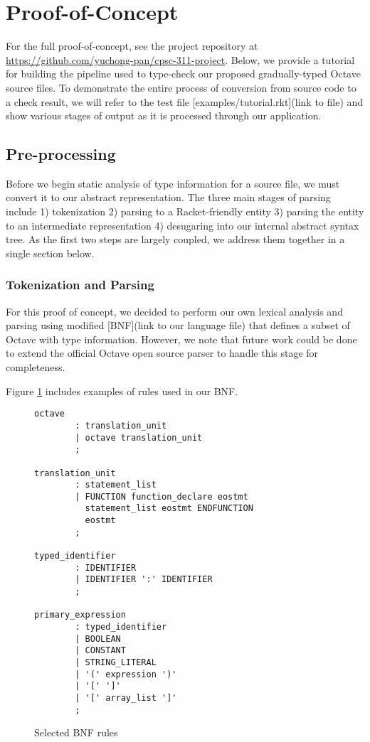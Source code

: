 \section{Proof-of-Concept}
For the full proof-of-concept, see the project repository at \url{https://github.com/yuchong-pan/cpsc-311-project}. Below, we provide a tutorial for building the pipeline used to type-check our proposed gradually-typed Octave source files. To demonstrate the entire process of conversion from source code to a check result, we will refer to the test file [examples/tutorial.rkt](link to file) and show various stages of output as it is processed through our application.

\subsection{Pre-processing}
Before we begin static analysis of type information for a source file, we must convert it to our abstract representation. The three main stages of parsing include 1) tokenization 2) parsing to a Racket-friendly entity 3) parsing the entity to an intermediate representation 4) desugaring into our internal abstract syntax tree. As the first two steps are largely coupled, we address them together in a single section below.

\subsubsection{Tokenization and Parsing}
For this proof of concept, we decided to perform our own lexical analysis and parsing using modified [BNF](link to our language file) that defines a subset of Octave with type information. However, we note that future work could be done to extend the official Octave open source parser \cite{johneaton2018octaveparser} to handle this stage for completeness.

Figure \ref{fig:bnf} includes examples of rules used in our BNF.

\begin{figure}[h]
    \begin{lstlisting}
octave
        : translation_unit
        | octave translation_unit
        ;

translation_unit
        : statement_list
        | FUNCTION function_declare eostmt
          statement_list eostmt ENDFUNCTION
          eostmt
        ;

typed_identifier
        : IDENTIFIER
        | IDENTIFIER ':' IDENTIFIER
        ;

primary_expression
        : typed_identifier
        | BOOLEAN
        | CONSTANT
        | STRING_LITERAL
        | '(' expression ')'
        | '[' ']'
        | '[' array_list ']'
        ;
    \end{lstlisting}
    \caption[]{Selected BNF rules}
    \label{fig:bnf}
\end{figure}


